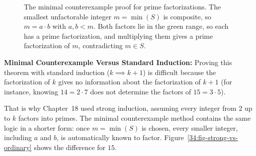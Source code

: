 \begin{figure}[htbp]
\caption{The minimal counterexample proof for prime factorizations. The smallest unfactorable integer $m = \min(S)$ is composite, so $m = a \cdot b$ with $a, b < m$. Both factors lie in the green range, so each has a prime factorization, and multiplying them gives a prime factorization of $m$, contradicting $m \in S$.}
\label{34:fig-prime-factorization-wop}
\end{figure}

\begin{intuitionbox}
\textbf{Minimal Counterexample Versus Standard Induction:}
Proving this theorem with standard induction ($k \implies k+1$) is difficult because the factorization of $k$ gives no information about the factorization of $k+1$ (for instance, knowing $14 = 2 \cdot 7$ does not determine the factors of $15 = 3 \cdot 5$).

That is why Chapter~18 used strong induction, assuming every integer from $2$ up to $k$ factors into primes. The minimal counterexample method contains the same logic in a shorter form: once $m = \min(S)$ is chosen, every smaller integer, including $a$ and $b$, is automatically known to factor. Figure~\ref{34:fig-strong-vs-ordinary} shows the difference for $15$.
\end{intuitionbox}

